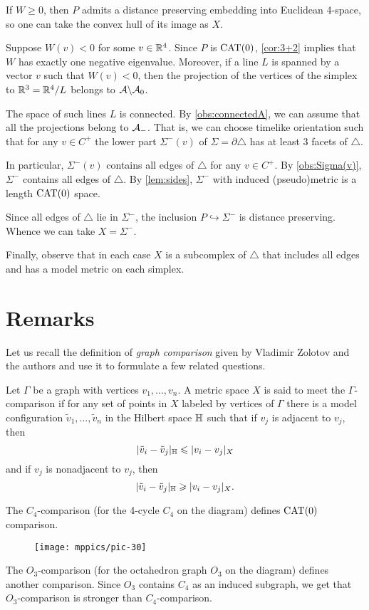 \documentclass{article}
\begin{document}
If $W\ge0$, then $P$ admits a distance preserving embedding into Euclidean 4-space, so one can take the convex hull of its image as $X$.

Suppose $W(v)<0$ for some $v\in\mathbb{R}^4$.
Since $P$ is $\mathrm{CAT}(0)$, \ref{cor:3+2} implies that $W$ has exactly one negative eigenvalue.
Moreover, if a line $L$ is spanned by a vector $v$ such that $W(v)<0$, then the projection of the vertices of the simplex to $\mathbb{R}^3=\mathbb{R}^4/L$ belongs to $\mathcal{A}\backslash\mathcal{A}_0$.

The space of such lines $L$ is connected.
By \ref{obs:connectedA}, we can assume that all the projections belong to $\mathcal{A}_-$.
That is, we can choose timelike orientation such that for any $v\in C^+$ the lower part $\Sigma^-(v)$ of $\Sigma=\partial \triangle$ has at least 3 facets of $\triangle$.

In particular, $\Sigma^-(v)$ contains all edges of $\triangle$ for any $v\in C^+$.
By \ref{obs:Sigma(v)}, $\Sigma^-$ contains all edges of $\triangle$.
By \ref{lem:sides}, $\Sigma^-$ with induced (pseudo)metric is a length $\mathrm{CAT}(0)$ space.

Since all edges of $\triangle$ lie in $\Sigma^-$, the inclusion $P\hookrightarrow \Sigma^-$ is distance preserving.
Whence we can take $X=\Sigma^-$.

Finally, observe that in each case $X$ is a subcomplex of $\triangle$ that includes all edges and has a model metric on each simplex.
\qeds

\section{Remarks}

Let us recall the definition of \emph{graph comparison} given by Vladimir Zolotov and the authors \cite{lebedeva-petrunin-zolotov} and use it to formulate a few related questions.

Let $\Gamma$ be a graph with vertices $v_1,\dots,v_n$.
A metric space $X$ is said to meet the $\Gamma$-comparison if for any set of points in $X$ labeled by vertices of $\Gamma$ there is a model configuration $\tilde v_1,\dots,\tilde v_n$ in the Hilbert space $\mathbb H$ such that 
if $v_j$ is adjacent to $v_j$, then
\[|\tilde v_i-\tilde v_j|_{\mathbb H}\leqslant | v_i-v_j|_{X}\]
and
if $v_j$ is nonadjacent to $v_j$, then
\[|\tilde v_i-\tilde v_j|_{\mathbb H}\geqslant | v_i-v_j|_{X}.\]

The $C_4$-comparison (for the 4-cycle $C_4$ on the diagram) defines $\mathrm{CAT}(0)$ comparison.
\begin{figure}[h!]
\vskip-0mm
\centering
\texttt{[image: mppics/pic-30]}
\end{figure}
The $O_3$-comparison (for the octahedron graph $O_3$ on the diagram) defines another comparison.
Since $O_3$ contains $C_4$ as an induced subgraph, we get that $O_3$-comparison is stronger than $C_4$-comparison.
\end{document}
